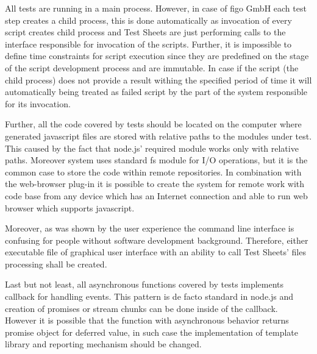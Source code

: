 All tests are running in a main process. However, in case of figo GmbH each test step creates a child process, this is done automatically as invocation of every script creates child process and Test Sheets are just performing calls to the interface responsible for invocation of the scripts. Further, it is impossible to define time constraints for script execution since they are predefined on the stage of the script development process and are immutable. In case if the script (the child process) does not provide a result withing the specified period of time it will automatically being treated as failed script by the part of the system responsible for its invocation.

Further, all the code covered by tests should be located on the computer where generated javascript files are stored with relative paths to the modules under test. This caused by the fact that node.js' required module works only with relative paths. Moreover system uses standard fs module for I/O operations, but it is the common case to store the code within remote repositories. In combination with the web-browser plug-in it is possible to create the system for remote work with code base from any device which has an Internet connection and able to run web browser which supports javascript.

Moreover, as was shown by the user experience the command line interface is confusing for people without software development background. Therefore, either executable file of graphical user interface with an ability to call Test Sheets' files processing shall be created.

Last but not least, all asynchronous functions covered by tests implements callback for handling events. This pattern is de facto standard in node.js and creation of promises or stream chunks can be done inside of the callback. However it is possible that the function with asynchronous behavior returns promise object for deferred value, in such case the implementation of template library and reporting mechanism should be changed.

